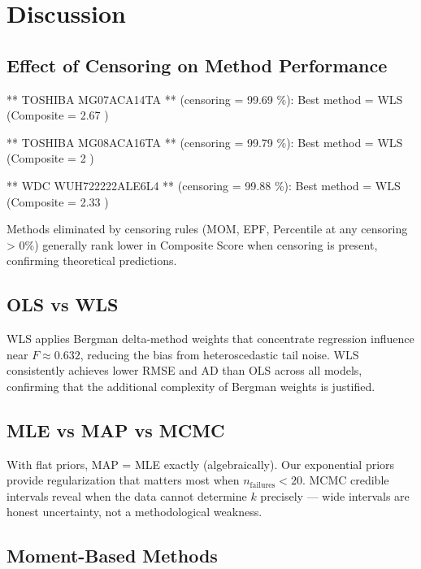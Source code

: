 \documentclass[
]{article}
\begin{document}
\section{Discussion}\label{discussion}

\subsection{Effect of Censoring on Method
Performance}\label{effect-of-censoring-on-method-performance}

** TOSHIBA MG07ACA14TA ** (censoring = 99.69 \%): Best method = WLS
(Composite = 2.67 )

** TOSHIBA MG08ACA16TA ** (censoring = 99.79 \%): Best method = WLS
(Composite = 2 )

** WDC WUH722222ALE6L4 ** (censoring = 99.88 \%): Best method = WLS
(Composite = 2.33 )

Methods eliminated by censoring rules (MOM, EPF, Percentile at any
censoring \textgreater{} 0\%) generally rank lower in Composite Score
when censoring is present, confirming theoretical predictions.

\subsection{OLS vs WLS}\label{ols-vs-wls}

WLS applies Bergman delta-method weights that concentrate regression
influence near \(F \approx 0.632\), reducing the bias from
heteroscedastic tail noise. WLS consistently achieves lower RMSE and AD
than OLS across all models, confirming that the additional complexity of
Bergman weights is justified.

\subsection{MLE vs MAP vs MCMC}\label{mle-vs-map-vs-mcmc}

With flat priors, MAP = MLE exactly (algebraically). Our exponential
priors provide regularization that matters most when
\(n_{\text{failures}} < 20\). MCMC credible intervals reveal when the
data cannot determine \(k\) precisely --- wide intervals are honest
uncertainty, not a methodological weakness.

\subsection{Moment-Based Methods}\label{moment-based-methods}
\end{document}
